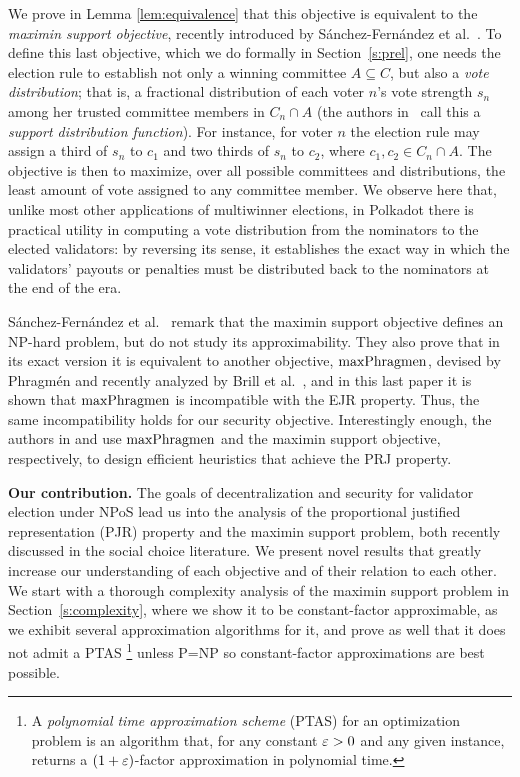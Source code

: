 We prove in Lemma \ref{lem:equivalence} that this objective is equivalent to the \emph{maximin support objective}, recently introduced by Sánchez-Fernández et al.~\cite{sanchez2016maximin}. 
To define this last objective, which we do formally in Section~\ref{s:prel}, one needs the election rule to establish not only a winning committee $A\subseteq C$, but also a \emph{vote distribution}; that is, a fractional distribution of each voter $n$'s vote strength $s_n$ among her trusted committee members in $C_n\cap A$ (the authors in~\cite{sanchez2016maximin} call this a \emph{support distribution function}). For instance, for voter $n$ the election rule may assign a third of $s_n$ to $c_1$ and two thirds of $s_n$ to $c_2$, where $c_1, c_2\in C_n\cap A$. 
The objective is then to maximize, over all possible committees and distributions, the least amount of vote assigned to any committee member. 
We observe here that, unlike most other applications of multiwinner elections, in Polkadot there is practical utility in computing a vote distribution from the nominators to the elected validators: by reversing its sense, it establishes the exact way in which the validators' payouts or penalties must be distributed back to the nominators at the end of the era.

Sánchez-Fernández et al.~\cite{sanchez2016maximin} remark that the maximin support objective defines an NP-hard problem, but do not study its approximability. They also prove that in its exact version it is equivalent to another objective, $\operatorname{maxPhragmen}$, devised by Phragm\'{e}n and recently analyzed by Brill et al.~\cite{brill2017phragmen}, and in this last paper it is shown that $\operatorname{maxPhragmen}$ is incompatible with the EJR property. Thus, the same incompatibility holds for our security objective. 
Interestingly enough, the authors in \cite{brill2017phragmen} and \cite{sanchez2016maximin} use $\operatorname{maxPhragmen}$ and the maximin support objective, respectively, to design efficient heuristics that achieve the PRJ property. 

\textbf{Our contribution.}
The goals of decentralization and security for validator election under NPoS lead us into the analysis of the proportional justified representation (PJR) property and the maximin support problem, both recently discussed in the social choice literature. We present novel results that greatly increase our understanding of each objective and of their relation to each other. 
%
We start with a thorough complexity analysis of the maximin support problem in Section~\ref{s:complexity}, 
where we show it to be constant-factor approximable, as we exhibit several approximation algorithms for it, and prove as well that it does not admit a PTAS%
    \footnote{A \emph{polynomial time approximation scheme} (PTAS) for an optimization problem is an algorithm that, for any constant $\varepsilon>0$ and any given instance, returns a $(1+\varepsilon)$-factor approximation in polynomial time.}%
unless P=NP so constant-factor approximations are best possible.

